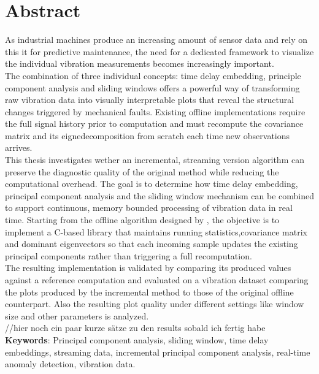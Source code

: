 \chapter*{Abstract}\label{cha:abstract}
As industrial machines produce an increasing amount of sensor data and rely on this it for predictive maintenance, the need for a dedicated framework to visualize the individual vibration measurements becomes increasingly important.\\ 
The combination of three individual concepts: time delay embedding, principle component analysis and sliding windows offers a powerful way of transforming raw vibration data into visually interpretable plots that reveal the structural changes triggered by mechanical faults. 
Existing offline implementations require the full signal history prior to computation and must recompute the covariance matrix and its eignedecomposition from scratch each time new observations arrives. \\
This thesis investigates wether an incremental, streaming version algorithm can preserve the diagnostic quality of the original method while reducing the computational overhead. The goal is to determine how time delay embedding, principal component analysis and the sliding window mechanism can be combined to support continuous, memory bounded processing of vibration data in real time.
Starting from the offline algorithm designed by \textcite{rakuschek2025visual}, the objective is to implement a C-based library that maintains running statistics,covariance matrix and dominant eigenvectors so that each incoming sample updates the existing principal components rather than triggering a full recomputation.\\
The resulting implementation is validated by comparing its produced values against a reference computation and evaluated on a vibration dataset comparing the plots produced by the incremental method to those of the original offline counterpart. Also the resulting plot quality under different settings like window size and other parameters is analyzed. \\

//hier noch ein paar kurze sätze zu den results sobald ich fertig habe \\


\textbf{Keywords}: Principal component analysis, sliding window, time delay embeddings, streaming data, incremental principal component analysis, real-time anomaly detection, vibration data.

\newpage\null\thispagestyle{empty}\newpage

